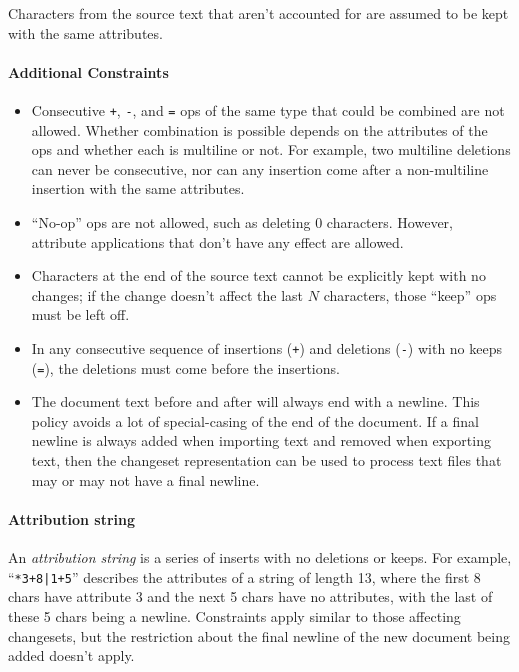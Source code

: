 \documentclass[12pt]{article}
\begin{document}
Characters from the source text that aren't accounted for
are assumed to be kept with the same attributes.

\paragraph{Additional Constraints}

\begin{itemize}
\item Consecutive \verb_+_, \verb_-_, and \verb_=_ ops of
  the same type that could be combined are not allowed.
  Whether combination is possible depends on the
  attributes of the ops and whether each is multiline or
 not.  For example, two multiline deletions can never be
 consecutive, nor can any insertion come after a
 non-multiline insertion with the same attributes.
\item ``No-op'' ops are not allowed, such as deleting 0
  characters.  However, attribute applications that don't
  have any effect are allowed.
\item Characters at the end of the source text cannot be
  explicitly kept with no changes; if the change doesn't
  affect the last $N$ characters, those ``keep'' ops must
  be left off.
\item In any consecutive sequence of insertions (\verb_+_)
  and deletions (\verb_-_) with no keeps (\verb_=_), the
  deletions must come before the insertions.
\item The document text before and after will always end
  with a newline.  This policy avoids a lot of
  special-casing of the end of the document.  If a final
  newline is always added when importing text and removed
  when exporting text, then the changeset representation
  can be used to process text files that may or may not
  have a final newline.
\end{itemize}

\paragraph{Attribution string}

An \emph{attribution string} is a series of inserts with
no deletions or keeps.  For example, ``\verb_*3+8|1+5_''
describes the attributes of a string of length 13, where
the first 8 chars have attribute 3 and the next 5 chars
have no attributes, with the last of these 5 chars being a
newline.  Constraints apply similar to those affecting
changesets, but the restriction about the final newline of
the new document being added doesn't apply.
\end{document}
